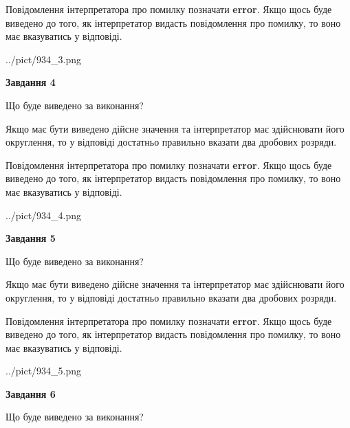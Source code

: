 \documentclass[12pt, ukrainian]{article}
\begin{document}
{\begin {Large}
Повідомлення інтерпретатора про помилку позначати \textbf{error}.
Якщо щось буде виведено до того, як інтерпретатор видасть повідомлення про помилку, 
то воно має вказуватись у відповіді. \par

\begin{center}
	{../pict/934_3.png}
\end{center}
\newpage

{\begin {center}\textbf{Завдання 4}\end {center}}\par
Що буде виведено за виконання? \par

Якщо має бути виведено дійсне значення та інтерпретатор має здійснювати його округлення, 
то у відповіді достатньо правильно вказати два дробових розряди.

Повідомлення інтерпретатора про помилку позначати \textbf{error}.
Якщо щось буде виведено до того, як інтерпретатор видасть повідомлення про помилку, 
то воно має вказуватись у відповіді. \par

\begin{center}
	{../pict/934_4.png}
\end{center}
\newpage

{\begin {center}\textbf{Завдання 5}\end {center}}\par
Що буде виведено за виконання? \par

Якщо має бути виведено дійсне значення та інтерпретатор має здійснювати його округлення, 
то у відповіді достатньо правильно вказати два дробових розряди.

Повідомлення інтерпретатора про помилку позначати \textbf{error}.
Якщо щось буде виведено до того, як інтерпретатор видасть повідомлення про помилку, 
то воно має вказуватись у відповіді. \par

\begin{center}
	{../pict/934_5.png}
\end{center}
\newpage

{\begin {center}\textbf{Завдання 6}\end {center}}\par
Що буде виведено за виконання? \par


\end{Large}}
\end{document}
